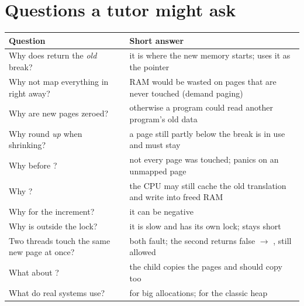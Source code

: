 \documentclass[11pt]{report}
\begin{document}
\section*{Questions a tutor might ask}

\begin{tabular}{@{}L{6.4cm} L{8.8cm}@{}}
\toprule
\textbf{Question} & \textbf{Short answer}\\\midrule
Why does  return the \emph{old} break? & it is where the new memory starts;  uses it as the pointer\\
Why not map everything in  right away? & RAM would be wasted on pages that are never touched (demand paging)\\
Why are new pages zeroed? & otherwise a program could read another program's old data\\
Why round \emph{up} when shrinking? & a page still partly below the break is in use and must stay\\
Why  before ? & not every page was touched;  panics on an unmapped page\\
Why ? & the CPU may still cache the old translation and write into freed RAM\\
Why  for the increment? & it can be negative\\
Why is  outside the lock? & it is slow and has its own lock;  stays short\\
Two threads touch the same new page at once? & both fault; the second  returns false $\to$ , still allowed\\
What about ? & the child copies the pages and should copy  too\\
What do real systems use? &  for big allocations;  for the classic heap\\
\bottomrule
\end{tabular}
\end{document}
